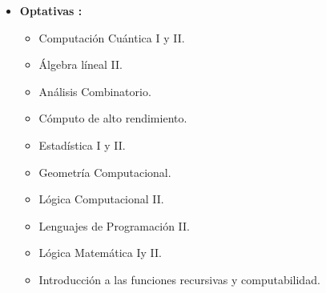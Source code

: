 \documentclass{article}
\begin{document}
\begin{itemize}
\begin{enumerate}
\end{enumerate}
\item {\bf Optativas :}\\
\begin{itemize}
\item Computación Cuántica I y II. \\
\item Álgebra líneal II. \\
\item Análisis Combinatorio.\\
\item Cómputo de alto rendimiento.\\
\item Estadística I y II.\\
\item Geometría Computacional.\\
\item Lógica Computacional II.\\
\item Lenguajes de Programación II.\\
\item Lógica Matemática Iy II.\\
\item Introducción a las funciones recursivas y computabilidad.
\end{itemize}

\end{itemize}	
\end{document}
